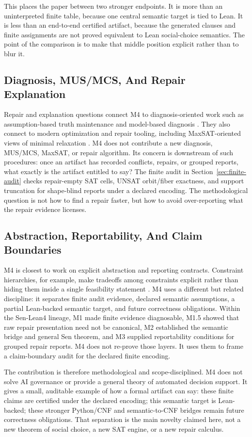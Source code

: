 This places the paper between two stronger endpoints. It is more than an
uninterpreted finite table, because one central semantic target is tied to
Lean. It is less than an end-to-end certified artifact, because the generated
clauses and finite assignments are not proved equivalent to Lean social-choice
semantics. The point of the comparison is to make that middle position
explicit rather than to blur it.

\subsection*{Diagnosis, MUS/MCS, And Repair Explanation}

Repair and explanation questions connect M4 to diagnosis-oriented work such as
assumption-based truth maintenance and model-based diagnosis
\citep{dekleer1986atms,reiter1987diagnosis}. They also connect to modern
optimization and repair tooling, including MaxSAT-oriented views of minimal
relaxation \citep{bacchus2021maxsat}. M4 does not contribute a new diagnosis,
MUS/MCS, MaxSAT, or repair algorithm. Its concern is downstream of such
procedures: once an artifact has recorded conflicts, repairs, or grouped
reports, what exactly is the artifact entitled to say? The finite audit in
Section~\ref{sec:finite-audit} checks repair-empty SAT cells, UNSAT
orbit/fiber exactness, and support truncation for shape-blind reports under a
declared encoding. The methodological question is not how to find a repair
faster, but how to avoid over-reporting what the repair evidence licenses.

\subsection*{Abstraction, Reportability, And Claim Boundaries}

M4 is closest to work on explicit abstraction and reporting contracts.
Constraint hierarchies, for example, make tradeoffs among constraints explicit
rather than hiding them inside a single feasibility statement
\citep{borning1992constraint}. M4 uses a different but related discipline: it
separates finite audit evidence, declared semantic assumptions, a partial
Lean-backed semantic target, and future correctness obligations. Within the
Sen-Lean4 lineage, M1 made finite evidence diagnosable, M1.5 showed that raw
repair presentation need not be canonical, M2 established the semantic bridge
and general Sen theorem, and M3 supplied reportability conditions for grouped
repair reports. M4 does not re-prove those layers. It uses them to frame a
claim-boundary audit for the declared finite encoding.

The contribution is therefore methodological and scope-disciplined. M4 does
not solve AI governance or provide a general theory of automated decision
support. It gives a small, auditable example of how a formal artifact can say:
these finite claims are certified under the declared encoding; this semantic
target is Lean-backed; these stronger Python/CNF and semantic-to-CNF bridges
remain future correctness obligations.
That separation is the main novelty claimed here, not a new theorem of social
choice, a new SAT engine, or a new repair calculus.
